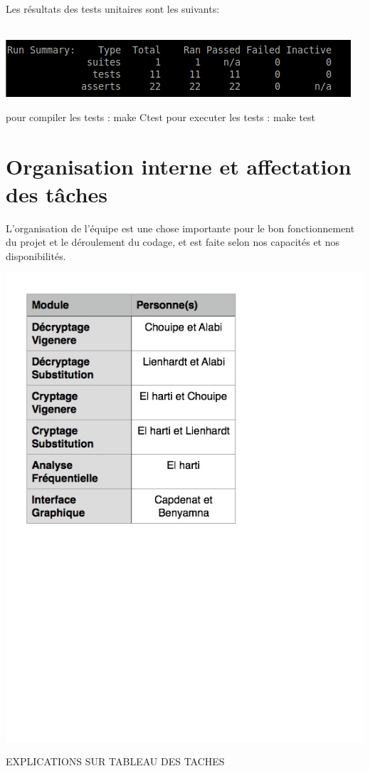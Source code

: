\documentclass[a4]{article}
\begin{document}
  
Les résultats des tests unitaires sont les suivants:\\ \\ 
		 \begin{center}\includegraphics[scale=0.5]{Capture.png}\end{center}
	pour compiler les tests : make Ctest
	pour executer les tests : make test
	\section{Organisation interne et affectation des tâches}
	L'organisation de l'équipe est une chose importante pour le bon fonctionnement du
  projet et le déroulement du codage, et est faite selon nos capacités et nos disponibilités.  \\ 
		 \begin{center}\includegraphics[scale=0.5]{tableau_tache_final.jpg}\end{center}
		 EXPLICATIONS SUR TABLEAU DES TACHES \\ 
		
\end{document}
